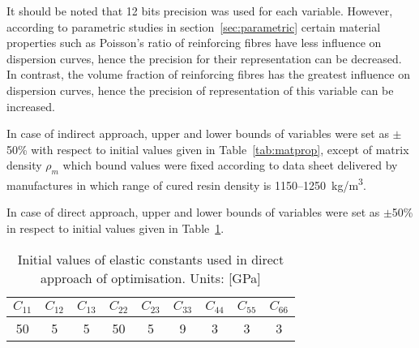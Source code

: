 \documentclass[preprint,12pt]{elsarticle}
\begin{document}
    It should be noted that 12 bits precision was used for each variable. However, according to parametric studies in section~\ref{sec:parametric} certain material properties such as Poisson's ratio of reinforcing fibres have less influence on dispersion curves, hence the precision for their representation can be decreased. In contrast, the volume fraction of reinforcing fibres has the greatest influence on dispersion curves, hence the precision of representation of this variable can be increased.
  
	In case of indirect approach, upper and lower bounds of variables were set as $\pm$50\% with respect to initial values given in Table~\ref{tab:matprop}, except of matrix density $\rho_m$ which bound values were fixed according to data sheet delivered by manufactures in which range of cured resin density is 1150--1250~kg/m\textsuperscript{3}. 
	
	In case of direct approach, upper and lower bounds of variables were set as  $\pm$50\% in respect to initial values given in Table~\ref{tab:Ctensor_initial}.
	\begin{table}[h!]
		\renewcommand{\arraystretch}{1.3}
		\centering \footnotesize
		\caption{Initial values of elastic constants used in direct approach of optimisation. Units: [GPa]}
		\begin{tabular}{ccccccccc} 
			\toprule
			$C_{11}$ & $C_{12}$ & $C_{13}$  & $C_{22}$ & $C_{23}$ & $C_{33}$ & $C_{44}$  & $C_{55}$ & $C_{66}$ \\
			\midrule
			50 &5& 5&  50 & 5 & 9 & 3 & 3 & 3\\
			\bottomrule 
		\end{tabular} 
		\label{tab:Ctensor_initial}
	\end{table}
\end{document}

